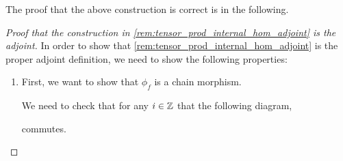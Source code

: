The proof that the above construction is correct is in the following.
\begin{proof}[Proof that the construction in \autoref{rem:tensor_prod_internal_hom_adjoint} is the adjoint]\phantom{hei}
    
    In order to show that \autoref{rem:tensor_prod_internal_hom_adjoint} is the proper adjoint definition, we need to show the following properties:
    \begin{enumerate}
        \item {
            First, we want to show that \( \phi_f \) is a chain morphism.

            We need to check that for any \( i \in {\mathbb{Z}} \) that the following diagram,
            \begin{center}
            \end{center}
            commutes.

}
\end{enumerate}
\end{proof}
